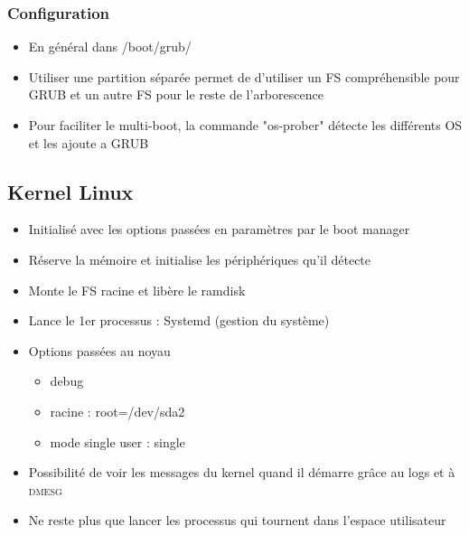 \documentclass[a4paper]{article}
\begin{document}
      \subsubsection{Configuration}
      \begin{itemize}[label = \textbullet, font = \Large]
        \item En général dans /boot/grub/
        \item Utiliser une partition séparée permet de d'utiliser un FS compréhensible pour GRUB et un autre FS pour le reste de l'arborescence
        \item Pour faciliter le multi-boot, la commande "os-prober" détecte les différents OS et les ajoute a GRUB
      \end{itemize}

      \subsection{Kernel Linux}
      \begin{itemize}[label = \textbullet, font = \Large]
        \item Initialisé avec les options passées en paramètres par le boot manager
        \item Réserve la mémoire et initialise les périphériques qu'il détecte
        \item Monte le FS racine et libère le ramdisk
        \item Lance le 1er processus : Systemd (gestion du système)
        \item Options passées au noyau
        \begin{itemize}[label=, font=\scriptsize] 
          \item debug
          \item racine : root=/dev/sda2
          \item mode single user : single
        \end{itemize}
        \item Possibilité de voir les messages du kernel quand il démarre grâce au logs et à \textsc{dmesg}
        \item Ne reste plus que lancer les processus qui tournent dans l'espace utilisateur
      \end{itemize}
\end{document}
